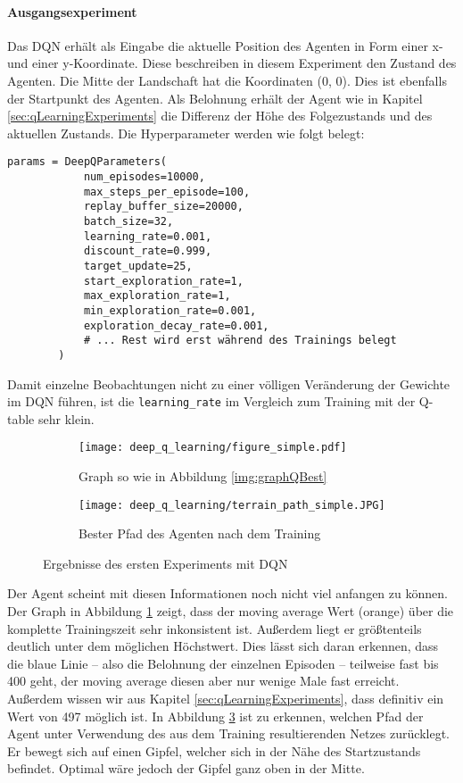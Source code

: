\paragraph{Ausgangsexperiment}
Das DQN erhält als Eingabe die aktuelle Position des Agenten in Form einer x- und einer y-Koordinate. Diese beschreiben in diesem Experiment den Zustand des Agenten. Die Mitte der Landschaft hat die Koordinaten (0, 0). Dies ist ebenfalls der Startpunkt des Agenten. Als Belohnung erhält der Agent wie in Kapitel \ref{sec:qLearningExperiments} die Differenz der Höhe des Folgezustands und des aktuellen Zustands. Die Hyperparameter werden wie folgt belegt:
\begin{verbatim}
params = DeepQParameters(
            num_episodes=10000,
            max_steps_per_episode=100,
            replay_buffer_size=20000,
            batch_size=32,
            learning_rate=0.001,
            discount_rate=0.999,
            target_update=25,
            start_exploration_rate=1,
            max_exploration_rate=1,
            min_exploration_rate=0.001,
            exploration_decay_rate=0.001,
            # ... Rest wird erst während des Trainings belegt
        )
\end{verbatim}
Damit einzelne Beobachtungen nicht zu einer völligen Veränderung der Gewichte im DQN führen, ist die \texttt{learning_rate} im Vergleich zum Training mit der Q-table sehr klein.
\begin{figure}[h!]
    \centering
    \begin{subfigure}[b]{0.49\textwidth}
        \texttt{[image: deep\_q\_learning/figure\_simple.pdf]}
        \caption{Graph so wie in Abbildung \ref{img:graphQBest}}
        \label{img:graphDeepQSimple}
    \end{subfigure}
    \begin{subfigure}[b]{0.49\textwidth}
        \texttt{[image: deep\_q\_learning/terrain\_path\_simple.JPG]}
        \caption{Bester Pfad des Agenten nach dem Training}
        \label{img:pathDeepQSimple}
    \end{subfigure}
    \caption{Ergebnisse des ersten Experiments mit DQN}
\end{figure}

Der Agent scheint mit diesen Informationen noch nicht viel anfangen zu können. Der Graph in Abbildung \ref{img:graphDeepQSimple} zeigt, dass der moving average Wert (orange) über die komplette Trainingszeit sehr inkonsistent ist. Außerdem liegt er größtenteils deutlich unter dem möglichen Höchstwert. Dies lässt sich daran erkennen, dass die blaue Linie -- also die Belohnung der einzelnen Episoden -- teilweise fast bis 400 geht, der moving average diesen aber nur wenige Male fast erreicht. Außerdem wissen wir aus Kapitel \ref{sec:qLearningExperiments}, dass definitiv ein Wert von 497 möglich ist. In Abbildung \ref{img:pathDeepQSimple} ist zu erkennen, welchen Pfad der Agent unter Verwendung des aus dem Training resultierenden Netzes zurücklegt. Er bewegt sich auf einen Gipfel, welcher sich in der Nähe des Startzustands befindet. Optimal wäre jedoch der Gipfel ganz oben in der Mitte.

